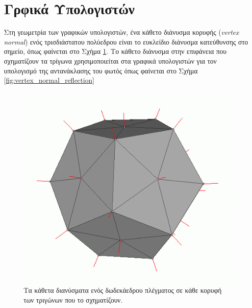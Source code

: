 \section{Γρφικά Υπολογιστών}
\label{appendix:computer_graphics}


\begin{definition}
\label{definition:vertex_normal}
 
 Στη γεωμετρία των γραφικών υπολογιστών, ένα κάθετο διάνυσμα κορυφής (\textsl{vertex normal}) ενός τρισδιάστατου πολύεδρου είναι το ευκλείδιο διάνυσμα κατεύθυνσης στο σημείο, όπως φαίνεται στο Σχήμα \ref{fig:vertex_normal}. Το κάθετο διάνυσμα στην επιφάνεια που σχηματίζουν τα τρίγωνα χρησιμοποιείται στα γραφικά υπολογιστών για τον υπολογισμό της αντανάκλασης του φωτός όπως φαίνεται στο Σχήμα \ref{fig:vertex_normal_reflection}

\begin{figure}[h]
\label{fig:vertex_normal}	
\centering
\includegraphics[scale=0.2]{images/appendix/vertex_normal.png}
\caption[Κάθετα διανύσματα κορυφών πολύεδρου]{Τα κάθετα διανύσματα ενός δωδεκάεδρου πλέγματος σε κάθε κορυφή των τριγώνων που το σχηματίζουν.}
\end{figure}


\end{definition}

